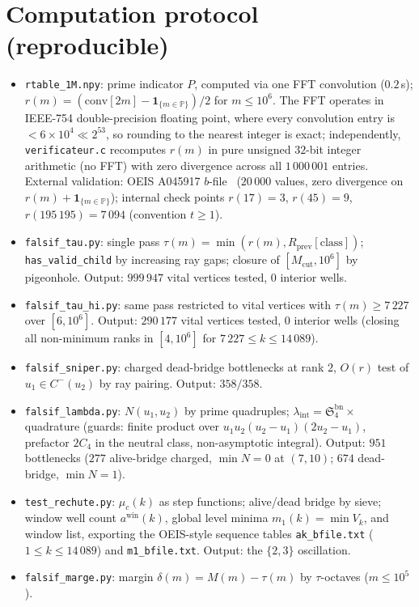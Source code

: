 \documentclass[11pt]{article}
\theoremstyle{plain}
\theoremstyle{definition}
\newcommand{\rch}{r}
\newcommand{\Vk}{V_{k}}
\newcommand{\Mcut}{M_{\mathrm{cut}}}
\newcommand{\lam}{\lambda_{\mathrm{int}}}
\begin{document}
\appendix

\section{Computation protocol (reproducible)}
\label{app:proto}

\begin{itemize}
\item \texttt{rtable\_1M.npy}: prime indicator $P$, computed via one
      FFT convolution ($0.2$\,s);
      $\rch(m) = (\mathrm{conv}[2m] - \mathbf{1}_{\{m \in \mathbb{P}\}})/2$
      for $m \le 10^{6}$. The FFT operates in IEEE-754
      double-precision floating point, where every convolution entry
      is $< 6 \times 10^{4} \ll 2^{53}$, so rounding to the nearest
      integer is exact; independently, \texttt{verificateur.c}
      recomputes $\rch(m)$ in pure unsigned $32$-bit integer
      arithmetic (no FFT) with zero divergence across all
      $1\,000\,001$ entries. External validation: OEIS A045917
      $b$-file~\cite{oeis} ($20\,000$ values, zero divergence on
      $\rch(m) + \mathbf{1}_{\{m \in \mathbb{P}\}}$); internal check
      points $\rch(17) = 3$, $\rch(45) = 9$, $\rch(195\,195) = 7\,094$
      (convention $t \ge 1$).
\item \texttt{falsif\_tau.py}: single pass
      $\tau(m) = \min(\rch(m), R_{\mathrm{prev}}[\text{class}])$;
      \texttt{has\_valid\_child} by increasing ray gaps; closure of
      $[\Mcut, 10^{6}]$ by pigeonhole. Output: $999\,947$ vital vertices
      tested, $0$ interior wells.
\item \texttt{falsif\_tau\_hi.py}: same pass restricted to vital vertices
      with $\tau(m) \ge 7\,227$ over $[6, 10^6]$. Output:
      $290\,177$ vital vertices tested, $0$ interior wells (closing all
      non-minimum ranks in $[4,10^6]$ for $7\,227 \le k \le 14\,089$).
\item \texttt{falsif\_sniper.py}: charged dead-bridge bottlenecks at
      rank $2$, $O(\rch)$ test of $u_1 \in C^{-}(u_2)$ by ray
      pairing. Output: $358/358$.
\item \texttt{falsif\_lambda.py}: $N(u_1,u_2)$ by prime quadruples;
      $\lam = \mathfrak{S}_4^{\mathrm{bn}} \times$ quadrature
      (guards: finite product over $u_1 u_2 (u_2-u_1)(2u_2-u_1)$,
      prefactor $2C_4$ in the neutral class, non-asymptotic
      integral). Output: $951$ bottlenecks ($277$ alive-bridge
      charged, $\min N = 0$ at $(7,10)$; $674$ dead-bridge,
      $\min N = 1$).
\item \texttt{test\_rechute.py}: $\mu_c(k)$ as step functions;
      alive/dead bridge by sieve; window well count
      $a^{\mathrm{win}}(k)$, global level minima $m_1(k) = \min \Vk$,
      and window list, exporting the OEIS-style sequence tables
      \texttt{ak\_bfile.txt} ($1 \le k \le 14\,089$) and
      \texttt{m1\_bfile.txt}. Output: the $\{2,3\}$ oscillation.
\item \texttt{falsif\_marge.py}: margin
      $\delta(m) = M(m) - \tau(m)$ by $\tau$-octaves ($m \le 10^{5}$).
\end{itemize}
\end{document}
